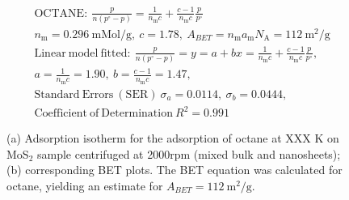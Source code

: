 

\begin{align*}
&\mathrm{OCTANE:}\ \frac{p}{n(p^\circ-p)}=\frac{1}{n_\mathrm{m}c}+\frac{c-1}{n_\mathrm{m}c}\frac{p}{p^\circ}\\
&{n_\mathrm{m}}=0.296\ \mathrm{mMol/g},\ c=1.78,\ A_{BET}={n_\mathrm{m}}{a_\mathrm{m}}{N_\mathrm{A}}=112\ \mathrm{m}^2\mathrm{/g}\\
&\mathrm{Linear\ model\ fitted:}\ \frac{p}{n(p^\circ-p)}=y=a+bx=\frac{1}{n_\mathrm{m}c}+\frac{c-1}{n_\mathrm{m}c}\frac{p}{p^\circ},\\
&a=\frac{1}{n_\mathrm{m}c}=1.90,\ b=\frac{c-1}{n_\mathrm{m}c}=1.47,\\
&\mathrm{Standard\ Errors\ (SER)}\ \sigma_a=0.0114,\ \sigma_b=0.0444,\\
&\mathrm{Coefficient\ of\ Determination}\ R^2 = 0.991
\end{align*}


\begin{figure}[htb]
\hfill
{}
\caption{(a) Adsorption isotherm for the adsorption of octane at XXX K on MoS$_2$ 
sample centrifuged at 2000rpm (mixed bulk and nanosheets);
(b) corresponding BET plots. The BET equation was calculated for octane, yielding an estimate for $A_{BET}=112\ \mathrm{m}^2\mathrm{/g}$.}

\label{fig:sa-Nanosheets-Prep-II-4000rpm-3mg-01-3mm-30C-S1-SA-10ml}
\end{figure}


